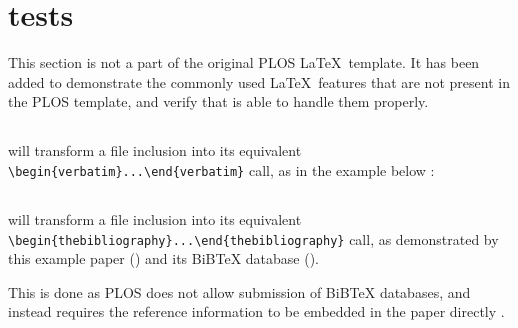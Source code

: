 \section*{ tests}

This section is not a part of the original PLOS \LaTeX~template.
It has been added to demonstrate the commonly used \LaTeX~features that are not present in the PLOS template, and verify that  is able to handle them properly.

\subsection*{}

 will transform a \verb|| file inclusion into its equivalent \verb|\begin{verbatim}...\end{verbatim}| call, as in the example below \cite{Project:friendly_name_mixin:CodeRepository}:



\subsection*{}

 will transform a \verb|| file inclusion into its equivalent \verb|\begin{thebibliography}...\end{thebibliography}| call, as demonstrated by this example paper () and its BiBTeX database ().

This is done as PLOS does not allow submission of BiBTeX databases, and instead requires the reference information to be embedded in the paper directly \cite{PLOS:LaTeX}.
